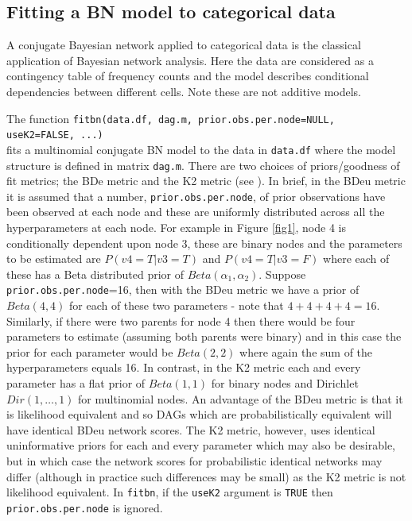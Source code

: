 \documentclass[nojss]{jss}
\begin{document}
\subsection{Fitting a BN model to categorical data} \label{sec1}
A conjugate Bayesian network applied to categorical data is the classical application of Bayesian network analysis. Here the data are considered as a contingency table of frequency counts and the model describes conditional dependencies between different cells. Note these are not additive models. 

The function {\tt fitbn(data.df, dag.m, prior.obs.per.node=NULL, useK2=FALSE, ...)}\\ fits a multinomial conjugate BN model to the data in {\tt data.df} where the model structure is defined in matrix {\tt dag.m}. There are two choices of priors/goodness of fit metrics; the BDe metric and the K2 metric (see \citeauthor{HECKERMAN1995} \citeyear{HECKERMAN1995}). In brief, in the BDeu metric it is assumed that a number, {\tt prior.obs.per.node}, of prior observations have been observed at each node and these are uniformly distributed across all the hyperparameters at each node. For example in Figure \ref{fig1}, node 4 is conditionally dependent upon node 3, these are binary nodes and the parameters to be estimated are $P(v4=T|v3=T)$ and $P(v4=T|v3=F)$ where each of these has a Beta distributed prior of $Beta(\alpha_1,\alpha_2)$. Suppose {\tt prior.obs.per.node}=16, then with the BDeu metric we have a prior of $Beta(4,4)$ for each of these two parameters - note that $4+4+4+4=16$. Similarly, if there were two parents for node 4 then there would be four parameters to estimate (assuming both parents were binary) and in this case the prior for each parameter would be $Beta(2,2)$ where again the sum of the hyperparameters equals 16. In contrast, in the K2 metric each and every parameter has a flat prior of $Beta(1,1)$ for binary nodes and Dirichlet $Dir(1,\dots,1)$ for multinomial nodes. An advantage of the BDeu metric is that it is likelihood equivalent and so DAGs which are probabilistically equivalent will have identical BDeu network scores. The K2 metric, however, uses identical uninformative priors for each and every parameter which may also be desirable, but in which case the network scores for probabilistic identical networks may differ (although in practice such differences may be small) as the K2 metric is not likelihood equivalent. In {\tt fitbn}, if the {\tt useK2} argument is {\tt TRUE} then {\tt prior.obs.per.node} is ignored. 
\end{document}
